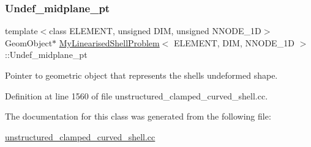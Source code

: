 \subsubsection{\texorpdfstring{Undef\+\_\+midplane\+\_\+pt}{Undef\_midplane\_pt}}
{\footnotesize\ttfamily template$<$class E\+L\+E\+M\+E\+NT, unsigned D\+IM, unsigned N\+N\+O\+D\+E\+\_\+1D$>$ \\
Geom\+Object$\ast$ \hyperlink{classMyLinearisedShellProblem}{My\+Linearised\+Shell\+Problem}$<$ E\+L\+E\+M\+E\+NT, D\+IM, N\+N\+O\+D\+E\+\_\+1D $>$\+::Undef\+\_\+midplane\+\_\+pt\hspace{0.3cm}{\ttfamily [private]}}



Pointer to geometric object that represents the shell\textquotesingle{}s undeformed shape. 



Definition at line 1560 of file unstructured\+\_\+clamped\+\_\+curved\+\_\+shell.\+cc.



The documentation for this class was generated from the following file\+:\begin{DoxyCompactItemize}
\item 
\hyperlink{unstructured__clamped__curved__shell_8cc}{unstructured\+\_\+clamped\+\_\+curved\+\_\+shell.\+cc}\end{DoxyCompactItemize}
